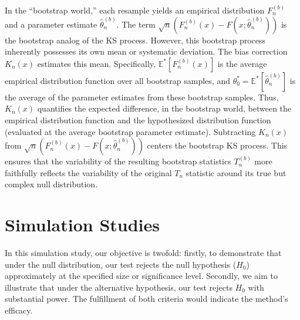 \documentclass[12pt]{article}
\begin{document}
In the ``bootstrap world,'' each resample yields an empirical distribution 
$F_n^{(b)}$ and a parameter estimate $\hat\theta^{(b)}_n$. The term 
$\sqrt{n}(F_n^{(b)}(x) - F(x;\hat\theta^{(b)}_n))$ is the bootstrap analog of 
the KS process. However, this bootstrap process inherently possesses its own 
mean or systematic deviation. The bias correction $K_n(x)$
estimates this mean.
Specifically, $\mathbb{E}^*[F_n^{(b)}(x)]$ is the average empirical distribution function over all bootstrap samples, and
$\theta^*_0 = \mathbb{E}^*[\hat\theta^{(b)}_n]$ is the average of 
the parameter estimates from these bootstrap samples. Thus,
$K_n(x)$ quantifies 
the expected difference, in the bootstrap world, between the empirical
distribution function and the hypothesized distribution function
(evaluated at the average bootstrap parameter estimate).
Subtracting $K_n(x)$ from
$\sqrt{n}(F_n^{(b)}(x) - F(x;\hat\theta^{(b)}_n))$ centers the 
bootstrap KS process. This ensures that the variability of the resulting 
bootstrap statistics $T_n^{(b)}$ more faithfully reflects the variability of 
the original $T_n$ statistic around its true but complex null
distribution.





\section{Simulation Studies}\label{sec:simu}

In this simulation study, our objective is twofold: firstly, to demonstrate that
under the null distribution, our test rejects the null hypothesis ($H_0$)
approximately at the specified size or significance level. Secondly, we aim to
illustrate that under the alternative hypothesis, our test rejects
$H_0$ with substantial power. The fulfillment of both criteria would indicate
the method's efficacy.
\end{document}

